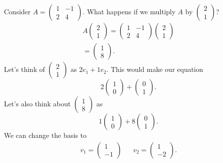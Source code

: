 \begin{eg}
  Consider $A=\begin{pmatrix} 1&-1\\2&4 \end{pmatrix} $. What happens if we multiply $A$ by $\begin{pmatrix} 2\\1 \end{pmatrix} $?
  \begin{align*}
    A\begin{pmatrix} 2\\1 \end{pmatrix} =\begin{pmatrix} 1&-1\\2&4 \end{pmatrix} \begin{pmatrix} 2\\1 \end{pmatrix} \\
    =\begin{pmatrix} 1\\8 \end{pmatrix} 
  .\end{align*}
  Let's think of $\begin{pmatrix} 2\\1 \end{pmatrix} $ as $2e_1+1e_2$. This would make our equation \[
  2\begin{pmatrix} 1\\0 \end{pmatrix} +\begin{pmatrix} 0\\1 \end{pmatrix} 
  .\] 
  Let's also think about $\begin{pmatrix} 1\\8 \end{pmatrix} $ as \[
  1\begin{pmatrix} 1\\0 \end{pmatrix} +8\begin{pmatrix} 0\\1 \end{pmatrix} 
  .\] 
  We can change the basis to 
  \begin{align*}
    v_1=\begin{pmatrix} 1\\-1 \end{pmatrix} && v_2=\begin{pmatrix} 1\\-2 \end{pmatrix} 
  .\end{align*}
\end{eg}

